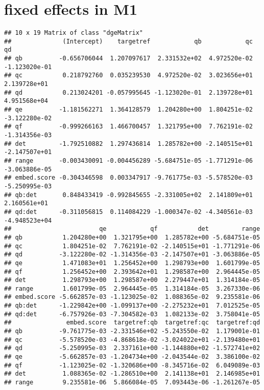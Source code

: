 \documentclass[
  12pt,
  oneside]{book}
\begin{document}
\section{fixed effects in M1}\label{fixed-effects-in-m1}

\begin{verbatim}
## 10 x 19 Matrix of class "dgeMatrix"
##              (Intercept)    targetref            qb            qc            qd
## qb          -0.656706044  1.207097617  2.331532e+02  4.972520e-02 -1.123020e-01
## qc           0.218792760  0.035239530  4.972520e-02  3.023656e+01  2.139728e+01
## qd           0.213024201 -0.057995645 -1.123020e-01  2.139728e+01  4.951568e+04
## qe          -1.181562271  1.364128579  1.204280e+00  1.804251e-02 -3.122280e-02
## qf          -0.999266163  1.466700457  1.321795e+00  7.762191e-02 -1.314356e-03
## det         -1.792510882  1.297436814  1.285782e+00 -2.140515e+01 -2.147507e+01
## range       -0.003430091 -0.004456289 -5.684751e-05 -1.771291e-06 -3.063886e-05
## embed.score -0.304346598  0.003347917 -9.761775e-03 -5.578520e-03 -5.250995e-03
## qb:det       0.848433419 -0.992845655 -2.331005e+02  2.141809e+01  2.160561e+01
## qd:det      -0.311056815  0.114084229 -1.000347e-02 -4.340561e-03 -4.948523e+04
##                        qe            qf           det         range
## qb           1.204280e+00  1.321795e+00  1.285782e+00 -5.684751e-05
## qc           1.804251e-02  7.762191e-02 -2.140515e+01 -1.771291e-06
## qd          -3.122280e-02 -1.314356e-03 -2.147507e+01 -3.063886e-05
## qe           1.471083e+01  1.256452e+00  1.298793e+00  1.601799e-05
## qf           1.256452e+00  2.393642e+01  1.298587e+00  2.964445e-05
## det          1.298793e+00  1.298587e+00  2.279447e+01  1.314184e-05
## range        1.601799e-05  2.964445e-05  1.314184e-05  3.267330e-06
## embed.score -5.662857e-03 -1.123025e-02  1.088365e-02  9.235581e-06
## qb:det      -1.229842e+00 -1.099137e+00 -2.275232e+01  7.012525e-05
## qd:det      -6.757926e-03 -7.304582e-03  1.082133e-02  3.758041e-05
##               embed.score  targetref:qb  targetref:qc  targetref:qd
## qb          -9.761775e-03 -2.331546e+02 -5.243550e-02  1.179001e-01
## qc          -5.578520e-03 -4.868618e-02 -3.024022e+01 -2.139480e+01
## qd          -5.250995e-03  2.337161e+00 -1.144880e+02 -1.572741e+02
## qe          -5.662857e-03 -1.204734e+00 -2.043544e-02  3.386100e-02
## qf          -1.123025e-02 -1.320686e+00 -8.345716e-02  6.049089e-03
## det          1.088365e-02 -1.286510e+00  2.141138e+01  2.146985e+01
## range        9.235581e-06  5.866084e-05  7.093443e-06 -1.261267e-05

\end{verbatim}
\end{document}
